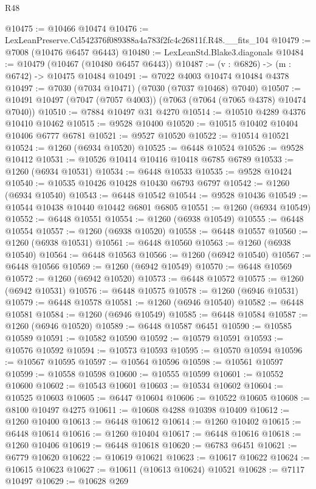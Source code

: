 \begin{lexlean}{R48}
\begin{coremodule}
@10475 := @10466 @10474
@10476 := LexLeanPreserve.Cd542376f089388a4a783f2fc4c26811f.R48.__fits_104
@10479 := @7008 (@10476 @6457 @6443)
@10480 := LexLeanStd.Blake3.diagonals
@10484 := @10479 (@10467 (@10480 @6457 @6443))
@10487 := (v : @6826) -> (m : @6742) -> @10475 @10484
@10491 := @7022 @4003 @10474 @10484 @4378
@10497 := @7030 (@7034 @10471) (@7030 (@7037 @10468) @7040)
@10507 := @10491 @10497 (@7047 (@7057 @4003)) (@7063 (@7064 (@7065 @4378) @10474 @7040))
@10510 := @7884 @10497 @31 @4270
@10514 := @10510 @4289 @4376 @10410 @10462
@10515 := @9528 @10400
@10520 := @10515 @10402 @10404 @10406 @6777 @6781
@10521 := @9527 @10520
@10522 := @10514 @10521
@10524 := @1260 (@6934 @10520)
@10525 := @6448 @10524
@10526 := @9528 @10412
@10531 := @10526 @10414 @10416 @10418 @6785 @6789
@10533 := @1260 (@6934 @10531)
@10534 := @6448 @10533
@10535 := @9528 @10424
@10540 := @10535 @10426 @10428 @10430 @6793 @6797
@10542 := @1260 (@6934 @10540)
@10543 := @6448 @10542
@10544 := @9528 @10436
@10549 := @10544 @10438 @10440 @10442 @6801 @6805
@10551 := @1260 (@6934 @10549)
@10552 := @6448 @10551
@10554 := @1260 (@6938 @10549)
@10555 := @6448 @10554
@10557 := @1260 (@6938 @10520)
@10558 := @6448 @10557
@10560 := @1260 (@6938 @10531)
@10561 := @6448 @10560
@10563 := @1260 (@6938 @10540)
@10564 := @6448 @10563
@10566 := @1260 (@6942 @10540)
@10567 := @6448 @10566
@10569 := @1260 (@6942 @10549)
@10570 := @6448 @10569
@10572 := @1260 (@6942 @10520)
@10573 := @6448 @10572
@10575 := @1260 (@6942 @10531)
@10576 := @6448 @10575
@10578 := @1260 (@6946 @10531)
@10579 := @6448 @10578
@10581 := @1260 (@6946 @10540)
@10582 := @6448 @10581
@10584 := @1260 (@6946 @10549)
@10585 := @6448 @10584
@10587 := @1260 (@6946 @10520)
@10589 := @6448 @10587 @6451
@10590 := @10585 @10589
@10591 := @10582 @10590
@10592 := @10579 @10591
@10593 := @10576 @10592
@10594 := @10573 @10593
@10595 := @10570 @10594
@10596 := @10567 @10595
@10597 := @10564 @10596
@10598 := @10561 @10597
@10599 := @10558 @10598
@10600 := @10555 @10599
@10601 := @10552 @10600
@10602 := @10543 @10601
@10603 := @10534 @10602
@10604 := @10525 @10603
@10605 := @6447 @10604
@10606 := @10522 @10605
@10608 := @8100 @10497 @4275
@10611 := @10608 @4288 @10398 @10409
@10612 := @1260 @10400
@10613 := @6448 @10612
@10614 := @1260 @10402
@10615 := @6448 @10614
@10616 := @1260 @10404
@10617 := @6448 @10616
@10618 := @1260 @10406
@10619 := @6448 @10618
@10620 := @6783 @6451
@10621 := @6779 @10620
@10622 := @10619 @10621
@10623 := @10617 @10622
@10624 := @10615 @10623
@10627 := @10611 (@10613 @10624) @10521
@10628 := @7117 @10497
@10629 := @10628 @269

\end{coremodule}
\end{lexlean}
